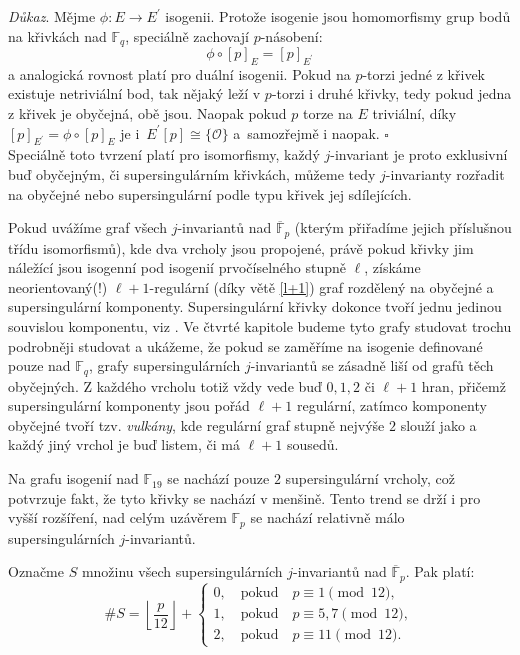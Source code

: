 \documentclass[12pt]{report}
\begin{document}
\noindent \textit{Důkaz}. Mějme $\phi : E \longrightarrow E^\prime$ isogenii. Protože isogenie jsou homomorfismy grup bodů na křivkách nad $\mathbb{F}_q$, speciálně zachovají $p$-násobení:
\begin{equation*}
\phi  \circ[p]_E = [p]_{E^\prime}
\end{equation*}
a analogická rovnost platí pro duální isogenii. Pokud na $p$-torzi jedné z křivek existuje netriviální bod, tak nějaký leží v $p$-torzi i druhé křivky, tedy pokud jedna z křivek je obyčejná, obě jsou. Naopak pokud $p$ torze na $E$ triviální, díky $[p]_{E^\prime} = \phi \circ [p]_E$ je i~$E^\prime [p] \cong \lbrace \mathcal{O} \rbrace$ a~samozřejmě i naopak. \hfill $\square$\\

Speciálně toto tvrzení platí pro isomorfismy, každý $j$-invariant je proto exklusivní buď obyčejným, či supersingulárním křivkách, můžeme tedy $j$-invarianty rozřadit na obyčejné nebo supersingulární podle typu křivek jej sdílejících.

Pokud uvážíme graf všech $j$-invariantů nad $\overline{\mathbb{F}}_p$ (kterým přiřadíme jejich příslušnou třídu isomorfismů), kde dva vrcholy jsou propojené, právě pokud křivky jim náležící jsou isogenní pod isogenií prvočíselného stupně $\ell$, získáme neorientovaný(!) $\ell+1$-regulární (díky větě \ref{l+1}) graf rozdělený na obyčejné a supersingulární komponenty. Supersingulární křivky dokonce tvoří jednu jedinou souvislou komponentu, viz \cite[Cor. 78]{Kohel}. Ve čtvrté kapitole budeme tyto grafy studovat trochu podrobněji studovat a ukážeme, že pokud se zaměříme na isogenie definované pouze nad $\mathbb{F}_q$, grafy supersingulárních $j$-invariantů se zásadně liší od grafů těch obyčejných. Z každého vrcholu totiž vždy vede buď $0,1,2$ či $\ell+1$ hran, přičemž supersingulární komponenty jsou pořád $\ell+1$ regulární, zatímco komponenty obyčejné tvoří tzv. \textit{vulkány}, kde regulární graf stupně nejvýše $2$ slouží jako  a každý jiný vrchol je buď listem, či má $\ell+1$ sousedů.

Na grafu isogenií nad $\mathbb{F}_{19}$ se nachází pouze $2$ supersingulární vrcholy, což potvrzuje fakt, že tyto křivky se nachází v menšině. Tento trend se drží i pro vyšší rozšíření, nad celým uzávěrem $\mathbb{F}_p$ se nachází relativně málo supersingulárních $j$-invariantů.

\begin{veta}
Označme $S$ množinu všech supersingulárních $j$-invariantů nad $\overline{\mathbb{F}}_{p}$. Pak platí:
\begin{equation*}
\# S = \left\lfloor \frac{p}{12} \right\rfloor + \begin{cases}
 0, \quad \text{pokud} \quad p \equiv 1 \pmod{12},\\
 1, \quad \text{pokud} \quad p \equiv 5,7 \pmod{12},\\
 2, \quad \text{pokud} \quad p \equiv 11 \pmod{12}.
 \end{cases}
\end{equation*}
\end{veta}
\end{document}
